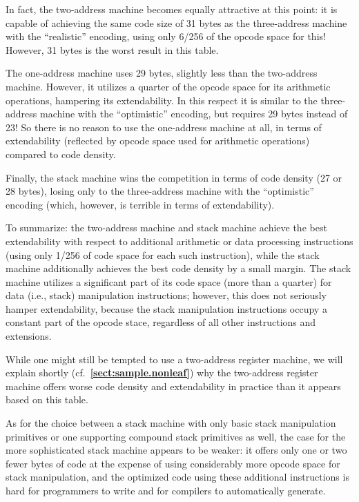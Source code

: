 \documentclass[12pt,oneside]{article}
\def\refpoint#1{{\rm\textbf{\ref{#1}}}}
\let\ptref=\refpoint
\begin{document}
In fact, the two-address machine becomes equally attractive at this point: it is capable of achieving the same code size of 31 bytes as the three-address machine with the ``realistic'' encoding, using only 6/256 of the opcode space for this! However, 31 bytes is the worst result in this table.

The one-address machine uses 29 bytes, slightly less than the two-address machine. However, it utilizes a quarter of the opcode space for its arithmetic operations, hampering its extendability. In this respect it is similar to the three-address machine with the ``optimistic'' encoding, but requires 29 bytes instead of 23! So there is no reason to use the one-address machine at all, in terms of extendability (reflected by opcode space used for arithmetic operations) compared to code density.

Finally, the stack machine wins the competition in terms of code density (27 or 28 bytes), losing only to the three-address machine with the ``optimistic'' encoding (which, however, is terrible in terms of extendability).

To summarize: the two-address machine and stack machine achieve the best extendability  with respect to additional arithmetic or data processing instructions (using only 1/256 of code space for each such instruction), while the stack machine additionally achieves the best code density by a small margin. The stack machine utilizes a significant part of its code space (more than a quarter) for data (i.e., stack) manipulation instructions; however, this does not seriously hamper extendability, because the stack manipulation instructions occupy a constant part of the opcode stace, regardless of all other instructions and extensions.

While one might still be tempted to use a two-address register machine, we will explain shortly (cf.~\ptref{sect:sample.nonleaf}) why the two-address register machine offers worse code density and extendability in practice than it appears based on this table.

As for the choice between a stack machine with only basic stack manipulation primitives or one supporting compound stack primitives as well, the case for the more sophisticated stack machine appears to be weaker: it offers only one or two fewer bytes of code at the expense of using considerably more opcode space for stack manipulation, and the optimized code using these additional instructions is hard for programmers to write and for compilers to automatically generate.
\end{document}
